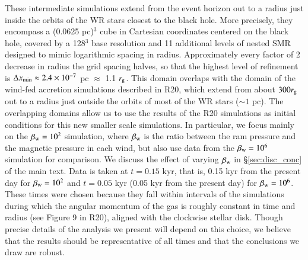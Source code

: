 \documentclass[twocolumn,twocolappendix,apjl,appendixfloats]{aastex63}
\begin{document}
These intermediate simulations extend from the event horizon out to a radius just inside the orbits of the WR stars closest to the black hole.  More precisely, they encompass a (0.0625 pc)$^3$ cube in Cartesian coordinates centered on the black hole, covered by a 128$^3$ base resolution and 11 additional levels of nested SMR designed to mimic logarithmic spacing in radius.  Approximately every factor of 2 decrease in radius the grid spacing halves, so that the highest level of refinement is $\Delta x _{\rm min} \approx 2.4 \times 10^{-7} $ pc $\approx$ 1.1 $r_{\rm g}$. This domain overlaps with the domain of the wind-fed accretion simulations described in R20, which extend from about $300 r_{\rm g}$ out to a radius just outside the orbits of most of the WR stars ($\sim 1$ pc).  
The overlapping domains allow us to use the results of the R20 simulations as initial conditions for this new smaller scale simulations.  In particular, we focus mainly on the $\beta_{\rm w}=10^2$ simulation, where $\beta_{\rm w}$ is the ratio between the ram pressure and the magnetic pressure in each wind, but also use data from the $\beta_{\rm w} = 10^6$ simulation for comparison.  We discuss the effect of varying $\beta_{\rm w}$ in \S \ref{sec:disc_conc} of the main text.  Data is taken at $t=0.15$ kyr, that is, 0.15 kyr from the present day for $\beta_{\rm w} = 10^2$ and $t = 0.05$ kyr (0.05 kyr from the present day) for $\beta_{\rm w} = 10^6$. These times were chosen because they fall within intervals of the simulations during which the angular momentum of the gas is roughly constant in time and radius (see Figure 9 in R20), aligned with the clockwise stellar disk.   Though precise details of the analysis we present will depend on this choice, we believe that the results should be representative of all times and that the conclusions we draw are robust.
\end{document}
